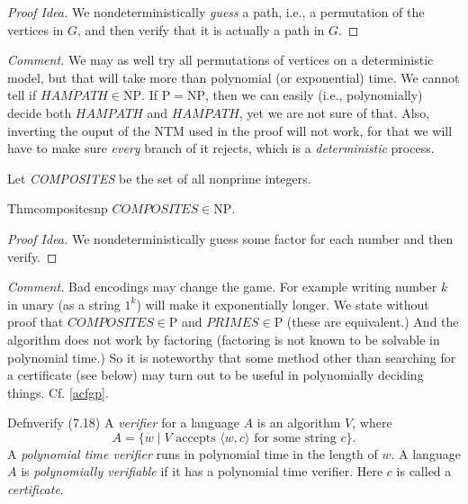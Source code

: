 \begin{proof}[Proof Idea]
  We nondeterministically \textit{guess} a path, i.e., a permutation of the vertices in $G$, and then verify that it is actually a path in $G$.
\end{proof}

\textit{Comment.} We may as well try all permutations of vertices on a deterministic model, but that will take more than polynomial (or exponential) time. We cannot tell if $\overline{\textit{HAMPATH}}\in \mathrm{NP}$. If $\mathrm{P}=\mathrm{NP}$, then we can easily (i.e., polynomially) decide both $\textit{HAMPATH}$ and $\overline{\textit{HAMPATH}}$, yet we are not sure of that. Also, inverting the ouput of the NTM used in the proof will not work, for that we will have to make sure \textit{every} branch of it rejects, which is a \textit{deterministic} process.

Let \textit{COMPOSITES} be the set of all nonprime integers.

\begin{reference}{Thm}{compositesnp}
  $\textit{COMPOSITES}\in \mathrm{NP}$.
\end{reference}

\begin{proof}[Proof Idea]
  We nondeterministically guess some factor for each number and then verify.
\end{proof}

\textit{Comment.} Bad encodings may change the game. For example writing number $k$ in unary (as a string $1^k$) will make it exponentially longer. We state without proof that $\textit{COMPOSITES}\in \mathrm{P}$ and $\textit{PRIMES}\in \mathrm{P}$ (these are equivalent.) And the algorithm does not work by factoring (factoring is not known to be solvable in polynomial time.) So it is noteworthy that some method other than searching for a certificate (see below) may turn out to be useful in polynomially deciding things. Cf. \ref{acfgp}.

\begin{reference}{Defn}{verify}
  (7.18) A \emph{verifier} for a language \( A \) is an algorithm \( V \), where
  \[
    A = \{ w \mid V \text{ accepts } \langle w, c \rangle \text{ for some string } c \}.
  \]
  A \emph{polynomial time verifier} runs in polynomial time in the length of \( w \). A language \( A \) is \emph{polynomially verifiable} if it has a polynomial time verifier. Here $c$ is called a \emph{certificate}.
\end{reference}

